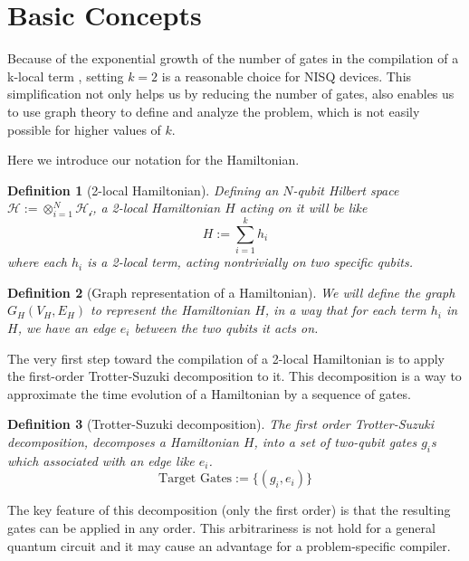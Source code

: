 \documentclass{report}
\newtheorem{definition}{Definition}
\begin{document}
\section{Basic Concepts}

Because of the exponential growth of the number of gates in the compilation of a k-local term \cite{?}, setting $k=2$ is a reasonable choice for NISQ devices. This simplification not only helps us by reducing the number of gates, also enables us to use graph theory to define and analyze the problem, which is not easily possible for higher values of $k$.

Here we introduce our notation for the Hamiltonian.

\begin{definition}[2-local Hamiltonian]
  \label{defn:2-local-hamiltonian}
  Defining an $N$-qubit Hilbert space
  $\mathcal{H} := \otimes_{i=1}^{N} \mathcal{H_i}$, a 2-local Hamiltonian $H$ acting on it will be like
  \begin{equation}
    H := \sum_{i=1}^{k} h_i
  \end{equation}
  where each $h_i$ is a 2-local term, acting nontrivially on two specific qubits.
\end{definition}
\begin{definition}[Graph representation of a Hamiltonian]
  We will define the graph $G_H(V_H, E_H)$ to represent the Hamiltonian $H$, in a way that for each term $h_i$ in $H$, we have an edge $e_i$ between the two qubits it acts on.
\end{definition}

The very first step toward the compilation of a 2-local Hamiltonian is to apply the first-order Trotter-Suzuki decomposition \cite{trotter1959} to it. This decomposition is a way to approximate the time evolution of a Hamiltonian by a sequence of gates. 

\begin{definition}[Trotter-Suzuki decomposition]
  \label{defn:trotter-suzuki}
  The first order Trotter-Suzuki decomposition, decomposes a Hamiltonian $H$, into a set of two-qubit gates $g_i$s which associated with an edge like $e_i$.
  \begin{equation}
    \text{Target Gates} := \{ (g_i, e_i) \}
  \end{equation}
\end{definition}

The key feature of this decomposition (only the first order) is that the resulting gates can be applied in any order. This arbitrariness is not hold for a general quantum circuit and it may cause an advantage for a problem-specific compiler. %
\end{document}
